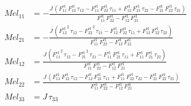 \begin{align}
Mel_{11} &= -\frac{J\,\left(F_{11}^{\mathrm{el}}\,F_{12}^{\mathrm{el}}\,\tau _{12}-F_{11}^{\mathrm{el}}\,F_{22}^{\mathrm{el}}\,\tau _{11}+F_{12}^{\mathrm{el}}\,F_{21}^{\mathrm{el}}\,\tau _{22}-F_{21}^{\mathrm{el}}\,F_{22}^{\mathrm{el}}\,\tau _{21}\right)}{F_{11}^{\mathrm{el}}\,F_{22}^{\mathrm{el}}-F_{12}^{\mathrm{el}}\,F_{21}^{\mathrm{el}}} \\ 
Mel_{21} &= -\frac{J\,\left({F_{12}^{\mathrm{el}}}^2\,\tau _{12}-{F_{22}^{\mathrm{el}}}^2\,\tau _{21}-F_{12}^{\mathrm{el}}\,F_{22}^{\mathrm{el}}\,\tau _{11}+F_{12}^{\mathrm{el}}\,F_{22}^{\mathrm{el}}\,\tau _{22}\right)}{F_{11}^{\mathrm{el}}\,F_{22}^{\mathrm{el}}-F_{12}^{\mathrm{el}}\,F_{21}^{\mathrm{el}}} \\ 
Mel_{12} &= \frac{J\,\left({F_{11}^{\mathrm{el}}}^2\,\tau _{12}-{F_{21}^{\mathrm{el}}}^2\,\tau _{21}-F_{11}^{\mathrm{el}}\,F_{21}^{\mathrm{el}}\,\tau _{11}+F_{11}^{\mathrm{el}}\,F_{21}^{\mathrm{el}}\,\tau _{22}\right)}{F_{11}^{\mathrm{el}}\,F_{22}^{\mathrm{el}}-F_{12}^{\mathrm{el}}\,F_{21}^{\mathrm{el}}} \\ 
Mel_{22} &= \frac{J\,\left(F_{11}^{\mathrm{el}}\,F_{12}^{\mathrm{el}}\,\tau _{12}-F_{12}^{\mathrm{el}}\,F_{21}^{\mathrm{el}}\,\tau _{11}+F_{11}^{\mathrm{el}}\,F_{22}^{\mathrm{el}}\,\tau _{22}-F_{21}^{\mathrm{el}}\,F_{22}^{\mathrm{el}}\,\tau _{21}\right)}{F_{11}^{\mathrm{el}}\,F_{22}^{\mathrm{el}}-F_{12}^{\mathrm{el}}\,F_{21}^{\mathrm{el}}} \\ 
Mel_{33} &= J\,\tau _{33} 
\end{align}
